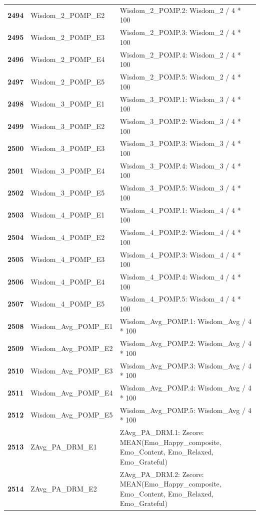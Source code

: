 \documentclass[
  letterpaper,
  DIV=11,
  numbers=noendperiod]{scrartcl}
\begin{document}
\begin{longtable}[t]{>{}cll}
\textbf{2494} & Wisdom\_2\_POMP\_E2 & Wisdom\_2\_POMP.2: Wisdom\_2 / 4 * 100\\
\textbf{2495} & Wisdom\_2\_POMP\_E3 & Wisdom\_2\_POMP.3: Wisdom\_2 / 4 * 100\\
\addlinespace
\textbf{2496} & Wisdom\_2\_POMP\_E4 & Wisdom\_2\_POMP.4: Wisdom\_2 / 4 * 100\\
\textbf{2497} & Wisdom\_2\_POMP\_E5 & Wisdom\_2\_POMP.5: Wisdom\_2 / 4 * 100\\
\textbf{2498} & Wisdom\_3\_POMP\_E1 & Wisdom\_3\_POMP.1: Wisdom\_3 / 4 * 100\\
\textbf{2499} & Wisdom\_3\_POMP\_E2 & Wisdom\_3\_POMP.2: Wisdom\_3 / 4 * 100\\
\textbf{2500} & Wisdom\_3\_POMP\_E3 & Wisdom\_3\_POMP.3: Wisdom\_3 / 4 * 100\\
\addlinespace
\textbf{2501} & Wisdom\_3\_POMP\_E4 & Wisdom\_3\_POMP.4: Wisdom\_3 / 4 * 100\\
\textbf{2502} & Wisdom\_3\_POMP\_E5 & Wisdom\_3\_POMP.5: Wisdom\_3 / 4 * 100\\
\textbf{2503} & Wisdom\_4\_POMP\_E1 & Wisdom\_4\_POMP.1: Wisdom\_4 / 4 * 100\\
\textbf{2504} & Wisdom\_4\_POMP\_E2 & Wisdom\_4\_POMP.2: Wisdom\_4 / 4 * 100\\
\textbf{2505} & Wisdom\_4\_POMP\_E3 & Wisdom\_4\_POMP.3: Wisdom\_4 / 4 * 100\\
\addlinespace
\textbf{2506} & Wisdom\_4\_POMP\_E4 & Wisdom\_4\_POMP.4: Wisdom\_4 / 4 * 100\\
\textbf{2507} & Wisdom\_4\_POMP\_E5 & Wisdom\_4\_POMP.5: Wisdom\_4 / 4 * 100\\
\textbf{2508} & Wisdom\_Avg\_POMP\_E1 & Wisdom\_Avg\_POMP.1: Wisdom\_Avg / 4 * 100\\
\textbf{2509} & Wisdom\_Avg\_POMP\_E2 & Wisdom\_Avg\_POMP.2: Wisdom\_Avg / 4 * 100\\
\textbf{2510} & Wisdom\_Avg\_POMP\_E3 & Wisdom\_Avg\_POMP.3: Wisdom\_Avg / 4 * 100\\
\addlinespace
\textbf{2511} & Wisdom\_Avg\_POMP\_E4 & Wisdom\_Avg\_POMP.4: Wisdom\_Avg / 4 * 100\\
\textbf{2512} & Wisdom\_Avg\_POMP\_E5 & Wisdom\_Avg\_POMP.5: Wisdom\_Avg / 4 * 100\\
\textbf{2513} & ZAvg\_PA\_DRM\_E1 & ZAvg\_PA\_DRM.1: Zscore:  MEAN(Emo\_Happy\_composite, Emo\_Content, Emo\_Relaxed, Emo\_Grateful)\\
\textbf{2514} & ZAvg\_PA\_DRM\_E2 & ZAvg\_PA\_DRM.2: Zscore:  MEAN(Emo\_Happy\_composite, Emo\_Content, Emo\_Relaxed, Emo\_Grateful)\\

\end{longtable}
\end{document}
